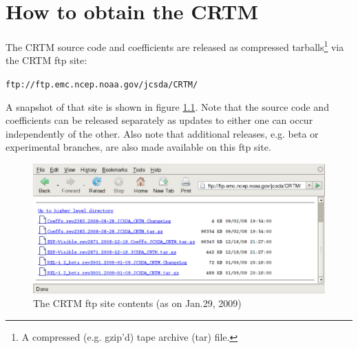 \chapter{How to obtain the CRTM}

The CRTM source code and coefficients are released as compressed tarballs\footnote{A compressed (e.g. gzip'd) tape archive (tar) file.} via the CRTM ftp site:

\hspace{1cm}\texttt{ftp://ftp.emc.ncep.noaa.gov/jcsda/CRTM/}

A snapshot of that site is shown in figure \ref{fig:ftp_site}. Note that the source code and coefficients can be released separately as updates to either one can occur independently of the other. Also note that additional releases, e.g. beta or experimental branches, are also made available on this ftp site.

\begin{figure}[htb]
  \centering
  \includegraphics[scale=0.5]{graphics/Get/CRTM_ftp_site.eps}
  \caption{The CRTM ftp site contents (as on Jan.29, 2009)}
  \label{fig:ftp_site}
\end{figure}
